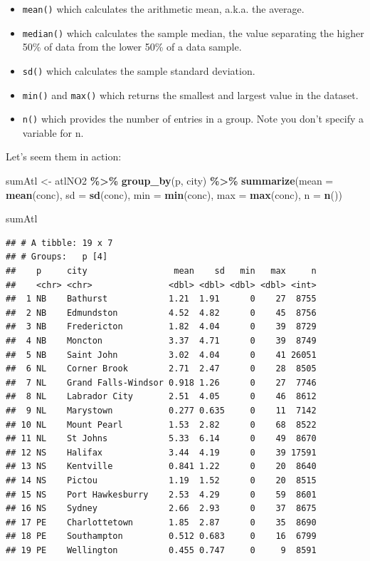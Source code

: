 \documentclass[
]{book}
\newenvironment{Shaded}{\begin{snugshade}}{\end{snugshade}}
\newcommand{\AttributeTok}[1]{\textcolor[rgb]{0.13,0.29,0.53}{#1}}
\newcommand{\FunctionTok}[1]{\textcolor[rgb]{0.13,0.29,0.53}{\textbf{#1}}}
\newcommand{\NormalTok}[1]{#1}
\newcommand{\OtherTok}[1]{\textcolor[rgb]{0.56,0.35,0.01}{#1}}
\newcommand{\SpecialCharTok}[1]{\textcolor[rgb]{0.81,0.36,0.00}{\textbf{#1}}}
\providecommand{\tightlist}{%
  \setlength{\itemsep}{0pt}\setlength{\parskip}{0pt}}
\begin{document}
\begin{itemize}
\tightlist
\item
  \texttt{mean()} which calculates the arithmetic mean, a.k.a. the average.
\item
  \texttt{median()} which calculates the sample median, the value separating the higher 50\% of data from the lower 50\% of a data sample.
\item
  \texttt{sd()} which calculates the sample standard deviation.
\item
  \texttt{min()} and \texttt{max()} which returns the smallest and largest value in the dataset.
\item
  \texttt{n()} which provides the number of entries in a group. Note you don't specify a variable for n.~
\end{itemize}

Let's seem them in action:

\begin{Shaded}
\begin{Highlighting}[]
\NormalTok{sumAtl }\OtherTok{\textless{}{-}}\NormalTok{ atlNO2 }\SpecialCharTok{\%\textgreater{}\%}
  \FunctionTok{group\_by}\NormalTok{(p, city) }\SpecialCharTok{\%\textgreater{}\%}
  \FunctionTok{summarize}\NormalTok{(}\AttributeTok{mean =} \FunctionTok{mean}\NormalTok{(conc),}
            \AttributeTok{sd =} \FunctionTok{sd}\NormalTok{(conc),}
            \AttributeTok{min =} \FunctionTok{min}\NormalTok{(conc), }
            \AttributeTok{max =} \FunctionTok{max}\NormalTok{(conc), }
            \AttributeTok{n =} \FunctionTok{n}\NormalTok{())}

\NormalTok{sumAtl}
\end{Highlighting}
\end{Shaded}

\begin{verbatim}
## # A tibble: 19 x 7
## # Groups:   p [4]
##    p     city                 mean    sd   min   max     n
##    <chr> <chr>               <dbl> <dbl> <dbl> <dbl> <int>
##  1 NB    Bathurst            1.21  1.91      0    27  8755
##  2 NB    Edmundston          4.52  4.82      0    45  8756
##  3 NB    Fredericton         1.82  4.04      0    39  8729
##  4 NB    Moncton             3.37  4.71      0    39  8749
##  5 NB    Saint John          3.02  4.04      0    41 26051
##  6 NL    Corner Brook        2.71  2.47      0    28  8505
##  7 NL    Grand Falls-Windsor 0.918 1.26      0    27  7746
##  8 NL    Labrador City       2.51  4.05      0    46  8612
##  9 NL    Marystown           0.277 0.635     0    11  7142
## 10 NL    Mount Pearl         1.53  2.82      0    68  8522
## 11 NL    St Johns            5.33  6.14      0    49  8670
## 12 NS    Halifax             3.44  4.19      0    39 17591
## 13 NS    Kentville           0.841 1.22      0    20  8640
## 14 NS    Pictou              1.19  1.52      0    20  8515
## 15 NS    Port Hawkesburry    2.53  4.29      0    59  8601
## 16 NS    Sydney              2.66  2.93      0    37  8675
## 17 PE    Charlottetown       1.85  2.87      0    35  8690
## 18 PE    Southampton         0.512 0.683     0    16  6799
## 19 PE    Wellington          0.455 0.747     0     9  8591
\end{verbatim}
\end{document}
